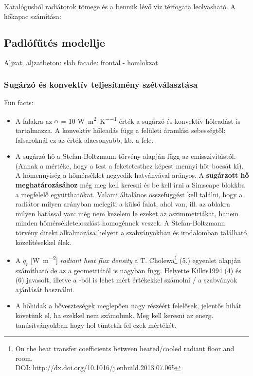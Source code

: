Katalógusból radiátorok tömege és a bennük lévő víz térfogata leolvasható. A hőkapac számítása:

\subsection{Padlófűtés modellje}

Aljzat, aljzatbeton: slab
facade: frontal - homlokzat





\subsubsection{Sugárzó és konvektív teljesítmény szétválasztása}

Fun facts:
~
\begin{itemize}[itemsep=6pt,topsep=0pt,parsep=0pt,partopsep=0pt]
	\item A falakra az $\alpha$ = 10 \si[per-mode = fraction]{\watt\per\meter\squared\per\kelvin} érték a sugárzó és konvektív hőleadást is tartalmazza. A konvektív hőleadás függ a felületi áramlási sebességtől: falsaroknál ez az érték alacsonyabb, kb. a fele.
	\item A sugárzó hő a Stefan-Boltzmann törvény alapján függ az emisszivitástól. (Annak a mértéke, hogy a test a feketetesthez képest mennyi hőt bocsát ki). A hőmennyiség a hőmérséklet negyedik hatványával arányos. A \textbf{sugárzott hő meghatározásához} még meg kell keresni és be kell írni a Simscape blokkba a megfelelő együtthatókat. Valami általános összefüggést kell találni, hogy a radiátor milyen arányban melegíti a külső falat, ahol van, ill. az ablakra milyen hatással van: még nem kezelem le ezeket az aszimmetriákat, hanem minden hőmérsékleteloszlást homogénnek veszek. A Stefan-Boltzmann törvény direkt alkalmazása helyett a szabványokban és irodalomban található közelítésekkel élek.
	\item A $q_r$ [\si[per-mode = fraction]{\watt\per\meter\squared}] \textit{radiant heat flux density} a \cite{CHOLEWA2013599} T. Cholewa\footnote{On the heat transfer coefficients between heated/cooled radiant floor and room. \\ DOI: http://dx.doi.org/10.1016/j.enbuild.2013.07.065} (5.) egyenlet alapján számítható de az a geometriától is nagyban függ. Helyette Kilkis1994 (4) és (6) javasolt, illetve a \cite{CHOLEWA2013599}-ból is lehet mért értékekkel számolni / a szabványok ajánlását használni.
	\item A hőhidak a hőveszteségek meglepően nagy részéért felelősek, jelentős hibát követünk el, ha ezekkel nem számolunk. Meg kell keresni az energ. tanúsítványokban hogy hol tüntetik fel ezek mértékét.
	
	
\end{itemize} 

